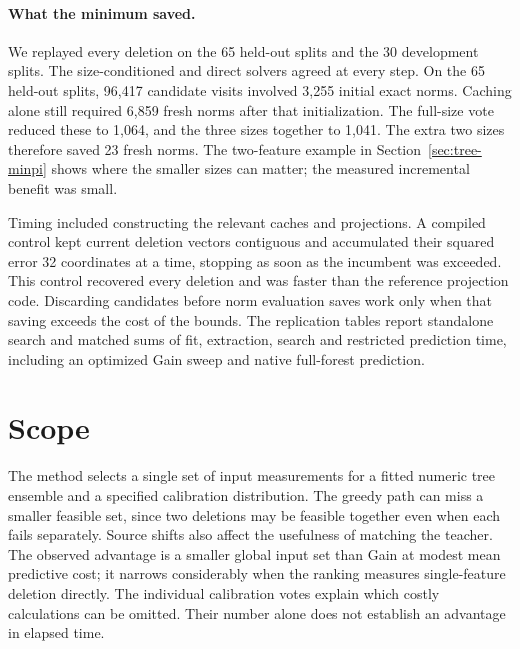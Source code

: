 \paragraph{What the minimum saved.}
We replayed every deletion on the 65 held-out splits and the 30 development
splits. The size-conditioned and direct solvers agreed at every step.
On the 65 held-out splits, 96,417 candidate visits involved 3,255 initial
exact norms. Caching alone still required 6,859 fresh norms after that
initialization. The full-size vote reduced these to 1,064, and the three
sizes together to 1,041. The extra two sizes therefore saved 23 fresh norms.
The two-feature example in Section~\ref{sec:tree-minpi} shows where the
smaller sizes can matter; the measured incremental benefit was small.

Timing included constructing the relevant caches and projections. A compiled
control kept current deletion vectors contiguous and accumulated their
squared error 32 coordinates at a time, stopping as soon as the incumbent
was exceeded. This control recovered every deletion and was faster than the
reference projection code. Discarding candidates before norm evaluation
saves work only when that saving exceeds the cost of the bounds. The
replication tables report standalone search and matched sums of fit,
extraction, search and restricted prediction time, including an optimized
Gain sweep and native full-forest prediction.

\section{Scope}
The method selects a single set of input measurements for a fitted numeric
tree ensemble and a specified calibration distribution. The greedy path can
miss a smaller feasible set, since two deletions may be feasible together
even when each fails separately. Source shifts also affect the usefulness of
matching the teacher. The observed advantage is a smaller global input set
than Gain at modest mean predictive cost; it narrows considerably when
the ranking measures single-feature deletion directly. The individual
calibration votes explain which costly calculations can be omitted. Their
number alone does not establish an advantage in elapsed time.
